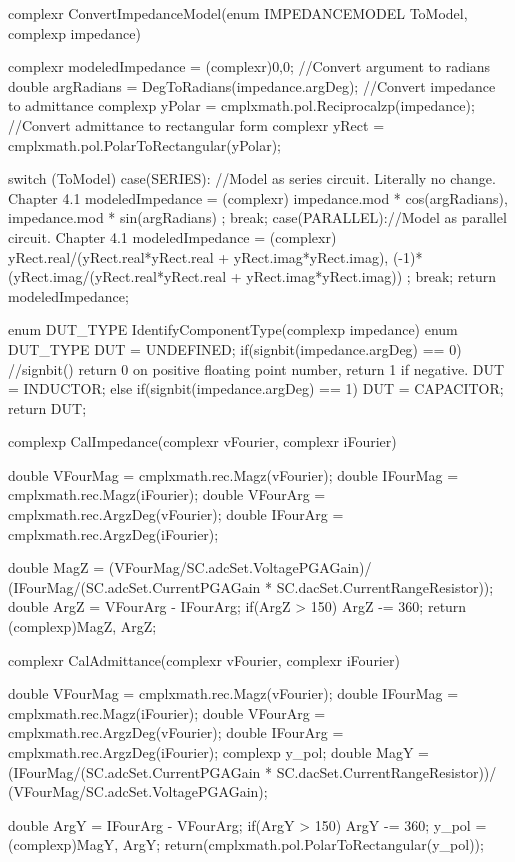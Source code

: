complexr ConvertImpedanceModel(enum IMPEDANCEMODEL ToModel, complexp impedance){
	complexr modeledImpedance = (complexr){0,0};
	//Convert argument to radians
	double argRadians = DegToRadians(impedance.argDeg);
	//Convert impedance to admittance
	complexp yPolar = cmplxmath.pol.Reciprocalzp(impedance);
	//Convert admittance to rectangular form
	complexr yRect = cmplxmath.pol.PolarToRectangular(yPolar);

	switch (ToModel){
	case(SERIES): //Model as series circuit. Literally no change. Chapter 4.1
			modeledImpedance = (complexr){
		 impedance.mod * cos(argRadians),
		 impedance.mod * sin(argRadians)
	};
			break;
	case(PARALLEL)://Model as parallel circuit. Chapter 4.1
		modeledImpedance = (complexr){
				 yRect.real/(yRect.real*yRect.real + yRect.imag*yRect.imag),
				 (-1)*(yRect.imag/(yRect.real*yRect.real + yRect.imag*yRect.imag))
			};
	break;
	}
	return modeledImpedance;
}

enum DUT_TYPE IdentifyComponentType(complexp impedance){
	enum DUT_TYPE DUT = UNDEFINED;
	if(signbit(impedance.argDeg) == 0){ //signbit() return 0 on positive floating point number, return 1 if negative.
		DUT = INDUCTOR;
	}else if(signbit(impedance.argDeg) == 1) {
		DUT = CAPACITOR;
	}
	return DUT;
}

complexp CalImpedance(complexr vFourier, complexr iFourier){
	double VFourMag = cmplxmath.rec.Magz(vFourier);
	double IFourMag = cmplxmath.rec.Magz(iFourier);
	double VFourArg = cmplxmath.rec.ArgzDeg(vFourier);
	double IFourArg = cmplxmath.rec.ArgzDeg(iFourier);

	double MagZ = (VFourMag/SC.adcSet.VoltagePGAGain)/
			(IFourMag/(SC.adcSet.CurrentPGAGain * SC.dacSet.CurrentRangeResistor));
	double ArgZ = VFourArg - IFourArg;
	if(ArgZ > 150){
		ArgZ -= 360;
	}
	return (complexp){MagZ, ArgZ};
}

complexr CalAdmittance(complexr vFourier, complexr iFourier){
	double VFourMag = cmplxmath.rec.Magz(vFourier);
	double IFourMag = cmplxmath.rec.Magz(iFourier);
	double VFourArg = cmplxmath.rec.ArgzDeg(vFourier);
	double IFourArg = cmplxmath.rec.ArgzDeg(iFourier);
	complexp y_pol;
	double MagY = (IFourMag/(SC.adcSet.CurrentPGAGain * SC.dacSet.CurrentRangeResistor))/
			(VFourMag/SC.adcSet.VoltagePGAGain);

	double ArgY = IFourArg - VFourArg;
	if(ArgY > 150){
		ArgY -= 360;
	}
	y_pol = (complexp){MagY, ArgY};
	return(cmplxmath.pol.PolarToRectangular(y_pol));
}


